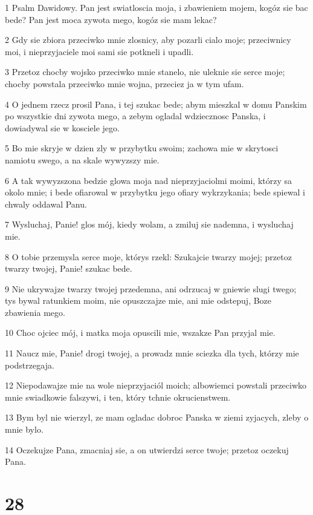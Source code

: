 \par 1 Psalm Dawidowy. Pan jest swiatloscia moja, i zbawieniem mojem, kogóz sie bac bede? Pan jest moca zywota mego, kogóz sie mam lekac?
\par 2 Gdy sie zbiora przeciwko mnie zlosnicy, aby pozarli cialo moje; przeciwnicy moi, i nieprzyjaciele moi sami sie potkneli i upadli.
\par 3 Przetoz chocby wojsko przeciwko mnie stanelo, nie uleknie sie serce moje; chocby powstala przeciwko mnie wojna, przeciez ja w tym ufam.
\par 4 O jednem rzecz prosil Pana, i tej szukac bede; abym mieszkal w domu Panskim po wszystkie dni zywota mego, a zebym ogladal wdziecznosc Panska, i dowiadywal sie w kosciele jego.
\par 5 Bo mie skryje w dzien zly w przybytku swoim; zachowa mie w skrytosci namiotu swego, a na skale wywyzszy mie.
\par 6 A tak wywyzszona bedzie glowa moja nad nieprzyjaciolmi moimi, którzy sa okolo mnie; i bede ofiarowal w przybytku jego ofiary wykrzykania; bede spiewal i chwaly oddawal Panu.
\par 7 Wysluchaj, Panie! glos mój, kiedy wolam, a zmiluj sie nademna, i wysluchaj mie.
\par 8 O tobie przemysla serce moje, którys rzekl: Szukajcie twarzy mojej; przetoz twarzy twojej, Panie! szukac bede.
\par 9 Nie ukrywajze twarzy twojej przedemna, ani odrzucaj w gniewie slugi twego; tys bywal ratunkiem moim, nie opuszczajze mie, ani mie odstepuj, Boze zbawienia mego.
\par 10 Choc ojciec mój, i matka moja opuscili mie, wszakze Pan przyjal mie.
\par 11 Naucz mie, Panie! drogi twojej, a prowadz mnie sciezka dla tych, którzy mie podstrzegaja.
\par 12 Niepodawajze mie na wole nieprzyjaciól moich; albowiemci powstali przeciwko mnie swiadkowie falszywi, i ten, który tchnie okrucienstwem.
\par 13 Bym byl nie wierzyl, ze mam ogladac dobroc Panska w ziemi zyjacych, zleby o mnie bylo.
\par 14 Oczekujze Pana, zmacniaj sie, a on utwierdzi serce twoje; przetoz oczekuj Pana.

\chapter{28}

